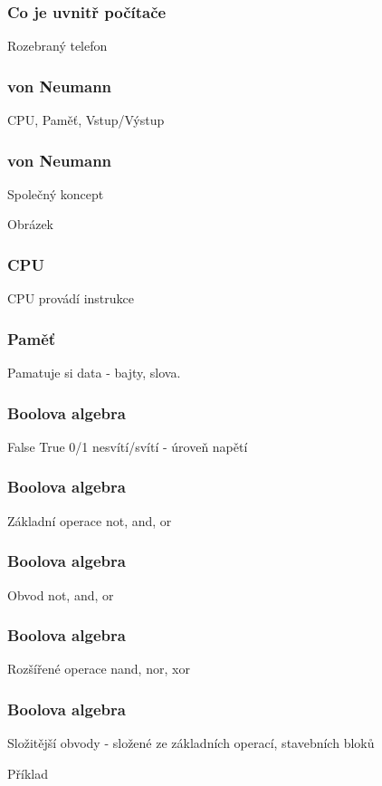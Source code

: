 \documentclass{beamer}
\begin{document}
\begin{frame}
\frametitle{Co je uvnitř počítače}

Rozebraný telefon
\end{frame}


\begin{frame}
\frametitle{von Neumann}

CPU, Paměť, Vstup/Výstup

\end{frame}

\begin{frame}
\frametitle{von Neumann}

Společný koncept

Obrázek

\end{frame}


\begin{frame}
\frametitle{CPU}

CPU provádí instrukce
\end{frame}

\begin{frame}
\frametitle{Paměť}

Pamatuje si data - bajty, slova.
\end{frame}

\begin{frame}
\frametitle{Boolova algebra}

False True 0/1 nesvítí/svítí - úroveň napětí
\end{frame}

\begin{frame}
\frametitle{Boolova algebra}

Základní operace not, and, or
\end{frame}

\begin{frame}
\frametitle{Boolova algebra}

Obvod not, and, or
\end{frame}

\begin{frame}
\frametitle{Boolova algebra}

Rozšířené operace nand, nor, xor
\end{frame}

\begin{frame}
\frametitle{Boolova algebra}

Složitější obvody - složené ze základních operací, stavebních bloků

Příklad
\end{frame}
\end{document}
